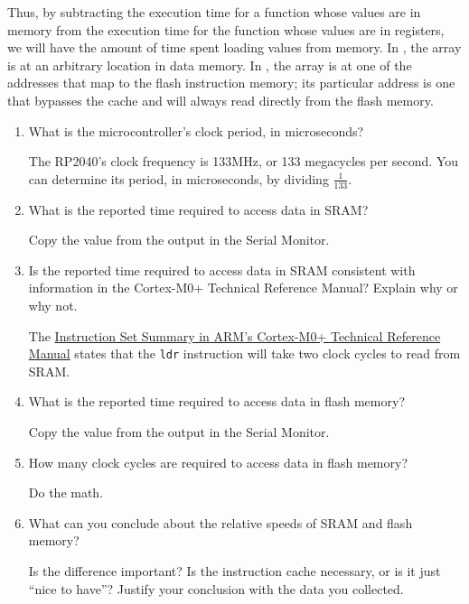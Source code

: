 Thus, by subtracting the execution time for a function whose values are in memory from the execution time for the function whose values are in registers,
we will have the amount of time spent loading values from memory.
In , the array is at an arbitrary location in data memory.
In , the array is at one of the addresses that map to the flash instruction memory; its particular address is one that bypasses the cache and will always read directly from the flash memory.

\begin{description}
\end{description}

\begin{enumerate}
    \item What is the microcontroller's clock period, in microseconds?

        The RP2040's clock frequency is 133MHz, or 133 megacycles per second.
        You can determine its period, in microseconds, by dividing $\frac{1}{133}$.

    \item What is the reported time required to access data in SRAM?

        Copy the value from the output in the Serial Monitor.

    \item Is the reported time required to access data in SRAM consistent with
        information in the Cortex-M0+ Technical Reference Manual?
        Explain why or why not.

        The \href{https://developer.arm.com/documentation/ddi0484/c/Programmers-Model/Instruction-set-summary}{Instruction Set Summary in ARM's Cortex-M0+ Technical Reference Manual}
        states that the \lstinline{ldr} instruction will take two clock cycles to read from SRAM\@.

    \item What is the reported time required to access data in flash memory?

        Copy the value from the output in the Serial Monitor.

    \item How many clock cycles are required to access data in flash memory?

        Do the math.

    \item What can you conclude about the relative speeds of SRAM and flash memory?

        Is the difference important?
        Is the instruction cache necessary, or is it just ``nice to have''?
        Justify your conclusion with the data you collected.

\end{enumerate}


